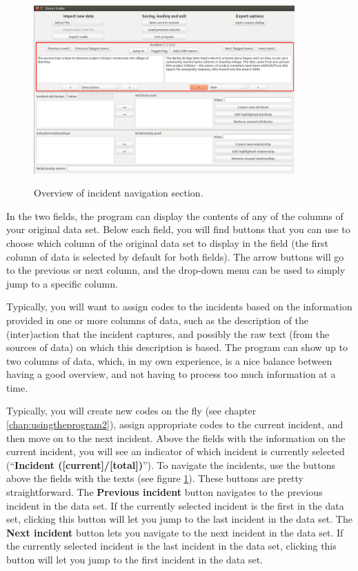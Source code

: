 \documentclass{memoir}
\begin{document}
\begin{figure}[h!]
  \centering
  \caption{Overview of incident navigation section.}
  \includegraphics[width=100mm]{Screenshot_4.pdf}
  \label{fig:incidentsoverview}
\end{figure}

In the two fields, the program can display the contents of any of the columns of your original data set. Below each field, you will find buttons that you can use to choose which column of the original data set to display in the field (the first column of data is selected by default for both fields). The arrow buttons will go to the previous or next column, and the drop-down menu can be used to simply jump to a specific column. 

Typically, you will want to assign codes to the incidents based on the information provided in one or more columns of data, such as the description of the (inter)action that the incident captures, and possibly the raw text (from the sources of data) on which this description is based. The program can show up to two columns of data, which, in my own experience, is a nice balance between having a good overview, and not having to process too much information at a time.

Typically, you will create new codes on the fly (see chapter \ref{chap:usingtheprogram2}), assign appropriate codes to the current incident, and then move on to the next incident. Above the fields with the information on the current incident, you will see an indicator of which incident is currently selected (``\textbf{Incident ([current]/[total])}''). To navigate the incidents, use the buttons above the fields with the texts (see figure \ref{fig:incidentsoverview}). These buttons are pretty straightforward. The \textbf{Previous incident} button navigates to the previous incident in the data set. If the currently selected incident is the first in the data set, clicking this button will let you jump to the last incident in the data set. The \textbf{Next incident} button lets you navigate to the next incident in the data set. If the currently selected incident is the last incident in the data set, clicking this button will let you jump to the first incident in the data set.
\end{document}
